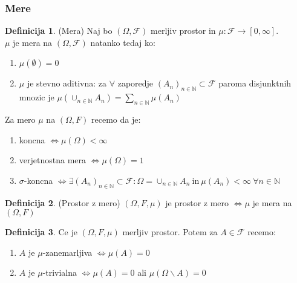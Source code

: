 \documentclass[a4paper,12pt]{article}
\theoremstyle{definition} %
\newtheorem{definicija}{Definicija}[section]
\theoremstyle{plain} %
\newcommand{\N}{\mathbb{N}}
\newcommand{\F}{\mathcal{F}}
\begin{document}
        \subsubsection{Mere}
            \begin{definicija}(Mera)
                Naj bo $\left( \Omega, \F \right)$ merljiv prostor in $\mu: \F \rightarrow [0, \infty] $. \\
                $\mu$ je mera na $\left( \Omega, \F \right)$ natanko tedaj ko: 
                \begin{enumerate}
                    \item $\mu(\emptyset) = 0$
                    \item $\mu$ je stevno aditivna: za $\forall$ zaporedje $(A_n)_{n \in \N} \subset \F$ paroma disjunktnih mnozic je $\mu(\cup_{n \in \N} A_n) = \sum_{n \in \N} \mu(A_n)$
                \end{enumerate}
            \end{definicija}

            Za mero $\mu$ na $\left( \Omega, F \right)$ recemo da je: 
            \begin{enumerate}
                \item koncna $\iff \mu(\Omega) < \infty$
                \item verjetnostna mera $\iff \mu(\Omega) = 1$
                \item $\sigma$-koncna $\iff \exists (A_n)_{n \in \N} \subset \F: \Omega = \cup_{n \in \N} A_n \ \text{in} \ \mu(A_n) < \infty \ \forall n \in \N$
            \end{enumerate}

            \begin{definicija}(Prostor z mero)
                $\left( \Omega, F, \mu \right)$ je prostor z mero $\iff \mu$ je mera na $(\Omega, F)$
            \end{definicija}

            \begin{definicija}
                Ce je $\left( \Omega, F, \mu \right)$ merljiv prostor. Potem za $A \in \F$ recemo:
                \begin{enumerate}
                    \item $A$ je $\mu$-zanemarljiva $\iff \mu(A) = 0$
                    \item $A$ je $\mu$-trivialna $\iff \mu(A) = 0$ ali $\mu(\Omega\backslash A) = 0$
                \end{enumerate}
            \end{definicija}
\end{document}
